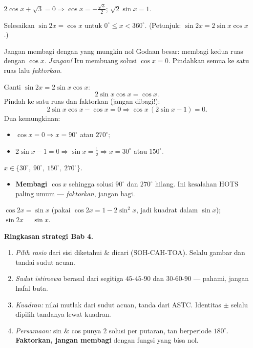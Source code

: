 \begin{variasi}
$2\cos x+\sqrt3=0\Rightarrow\cos x=-\frac{\sqrt3}{2}$; $\sqrt2\sin x=1$.
\end{variasi}

\begin{soalbox}{}
Selesaikan $\sin2x=\cos x$ untuk $0^\circ\le x<360^\circ$.
(Petunjuk: $\sin2x=2\sin x\cos x$.)
\end{soalbox}

\begin{ingat}{Jangan membagi dengan yang mungkin nol}
Godaan besar: membagi kedua ruas dengan $\cos x$. \emph{Jangan!} Itu membuang
solusi $\cos x=0$. Pindahkan semua ke satu ruas lalu \emph{faktorkan}.
\end{ingat}

\jawab
{} Ganti $\sin2x=2\sin x\cos x$:
\[
2\sin x\cos x=\cos x.
\]
 Pindah ke satu ruas dan faktorkan (jangan dibagi!):
\[
2\sin x\cos x-\cos x=0 \Rightarrow \cos x\,(2\sin x-1)=0.
\]
 Dua kemungkinan:
\begin{itemize}[leftmargin=*,topsep=1pt]
  \item $\cos x=0 \Rightarrow x=90^\circ$ atau $270^\circ$;
  \item $2\sin x-1=0 \Rightarrow \sin x=\tfrac12 \Rightarrow x=30^\circ$ atau
  $150^\circ$.
\end{itemize}
\jadi $x\in\{30^\circ,\ 90^\circ,\ 150^\circ,\ 270^\circ\}$.

\begin{jebakan}
\begin{itemize}[leftmargin=*,topsep=2pt]
  \item \textbf{Membagi $\cos x$} sehingga solusi $90^\circ$ dan $270^\circ$
  hilang. Ini kesalahan HOTS paling umum --- \emph{faktorkan}, jangan bagi.
\end{itemize}
\end{jebakan}

\begin{variasi}
$\cos2x=\sin x$ (pakai $\cos2x=1-2\sin^2 x$, jadi kuadrat dalam $\sin x$);
$\sin2x=\sin x$.
\end{variasi}

\begin{tips}
\textbf{Ringkasan strategi Bab 4.}
\begin{enumerate}[leftmargin=*,topsep=2pt]
  \item \emph{Pilih rasio} dari sisi diketahui \& dicari (SOH-CAH-TOA). Selalu
  gambar dan tandai sudut acuan.
  \item \emph{Sudut istimewa} berasal dari segitiga $45$-$45$-$90$ dan
  $30$-$60$-$90$ --- pahami, jangan hafal buta.
  \item \emph{Kuadran:} nilai mutlak dari sudut acuan, tanda dari ASTC.
  Identitas $\pm$ selalu dipilih tandanya lewat kuadran.
  \item \emph{Persamaan:} sin \& cos punya 2 solusi per putaran, tan berperiode
  $180^\circ$. \textbf{Faktorkan, jangan membagi} dengan fungsi yang bisa nol.
\end{enumerate}
\end{tips}


